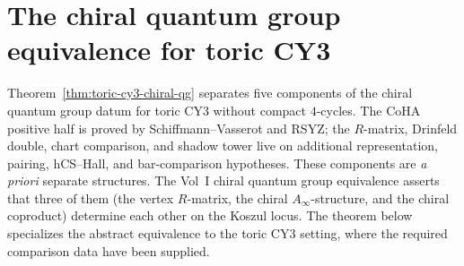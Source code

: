 \section{The chiral quantum group equivalence for toric CY3}
\label{sec:toric-chiral-qg-triangle}

Theorem~\ref{thm:toric-cy3-chiral-qg} separates five components
of the chiral quantum group datum for toric CY3 without compact
$4$-cycles. The CoHA positive half is proved by Schiffmann--Vasserot
and RSYZ; the $R$-matrix, Drinfeld double, chart comparison, and shadow
tower live on additional representation, pairing, hCS--Hall, and
bar-comparison hypotheses. These components are \emph{a priori}
separate structures. The Vol~I chiral quantum group equivalence
asserts that three of them
(the vertex $R$-matrix, the chiral $A_\infty$-structure, and the
chiral coproduct) determine each other on the Koszul locus. The theorem
below specializes the abstract equivalence to the toric CY3 setting,
where the required comparison data have been supplied.

